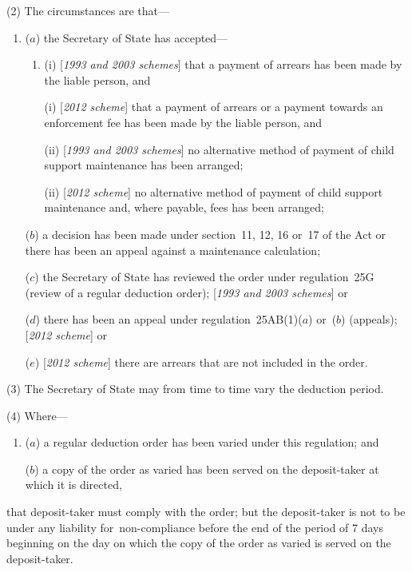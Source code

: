 \documentclass[12pt,a4paper]{article}
\begin{document}
(2) The circumstances are that—
\begin{enumerate}\item[]
($a$) the 
Secretary of State  %
has accepted—
\begin{enumerate}\item[]
(i) [\emph{1993 and 2003 schemes}] that a payment of arrears has been made by the liable person, and

(i) [\emph{2012 scheme}] that a payment of arrears 
or a payment towards an enforcement fee  %
has been made by the liable person, and

(ii) [\emph{1993 and 2003 schemes}] no alternative method of payment of child support maintenance has been arranged;

(ii) [\emph{2012 scheme}] no alternative method of payment of child support maintenance 
and, where payable, fees  %
has been arranged;
\end{enumerate}

($b$) a decision has been made under section~11, 12, 16 or~17 of the Act or there has been an appeal against a maintenance calculation;

($c$) the 
Secretary of State  %
has reviewed the order under regulation~25G (review of a regular deduction order); 
[\emph{1993 and 2003 schemes}] or  %

($d$) there has been an appeal under regulation~25AB(1)($a$)  or~($b$)  (appeals);
%
    [\emph{2012 scheme}] or

    ($e$) [\emph{2012 scheme}]
    there are arrears that are not included in the order.
\end{enumerate}

(3) The 
Secretary of State  %
may from time to time vary the deduction period.

(4) Where—
\begin{enumerate}\item[]
($a$) a regular deduction order has been varied under this regulation; and

($b$) a copy of the order as varied has been served on the deposit-taker at which it is directed,
\end{enumerate}
that deposit-taker must comply with the order; but the deposit-taker is not to be under any liability for~non-compliance before the end of the period of 7 days beginning on the day on which the copy of the order as varied is served on the deposit-taker.
\end{document}
